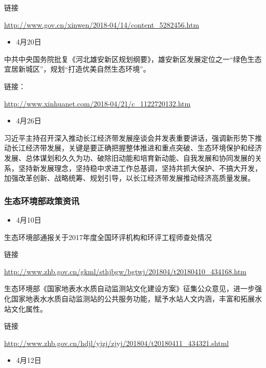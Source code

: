 \documentclass[
]{book}
\providecommand{\tightlist}{%
  \setlength{\itemsep}{0pt}\setlength{\parskip}{0pt}}
\begin{document}
链接

\url{http://www.gov.cn/xinwen/2018-04/14/content_5282456.htm}

\begin{itemize}
\tightlist
\item
  4月20日
\end{itemize}

中共中央国务院批复《河北雄安新区规划纲要》，雄安新区发展定位之一``绿色生态宜居新城区''，规划``打造优美自然生态环境''。

链接：

\url{http://www.xinhuanet.com/2018-04/21/c_1122720132.htm}

\begin{itemize}
\tightlist
\item
  4月26日
\end{itemize}

习近平主持召开深入推动长江经济带发展座谈会并发表重要讲话，强调新形势下推动长江经济带发展，关键是要正确把握整体推进和重点突破、生态环境保护和经济发展、总体谋划和久久为功、破除旧动能和培育新动能、自我发展和协同发展的关系，坚持新发展理念，坚持稳中求进工作总基调，坚持共抓大保护、不搞大开发，加强改革创新、战略统筹、规划引导，以长江经济带发展推动经济高质量发展。

\hypertarget{ux751fux6001ux73afux5883ux90e8ux653fux7b56ux8d44ux8baf}{%
\subsubsection*{生态环境部政策资讯}\label{ux751fux6001ux73afux5883ux90e8ux653fux7b56ux8d44ux8baf}}

\begin{itemize}
\tightlist
\item
  4月10日
\end{itemize}

生态环境部通报关于2017年度全国环评机构和环评工程师查处情况

链接

\url{http://www.zhb.gov.cn/gkml/sthjbgw/bgtwj/201804/t20180410_434168.htm}

生态环境部《国家地表水水质自动监测站文化建设方案》征集公众意见，进一步强化国家地表水水质自动监测站的公共服务功能，赋予水站人文内涵，丰富和拓展水站文化属性。

链接

\url{http://www.zhb.gov.cn/hdjl/yjzj/zjyj/201804/t20180411_434321.shtml}

\begin{itemize}
\tightlist
\item
  4月12日
\end{itemize}
\end{document}
